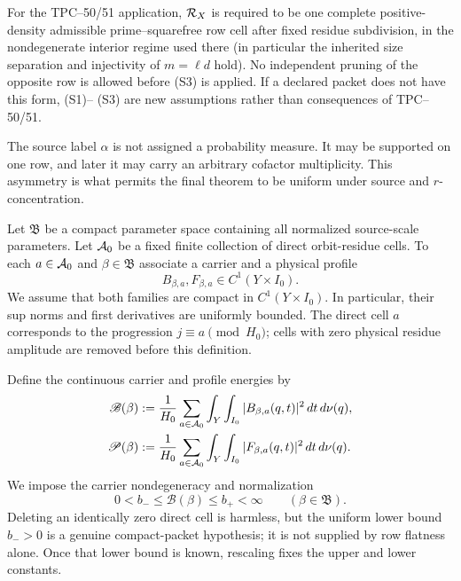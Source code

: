 For the TPC--50/51 application, \(\mathcal R_X\) is required to be one complete
positive-density admissible prime--squarefree row cell after fixed residue
subdivision, in the nondegenerate interior regime used there (in particular
the inherited size separation and injectivity of \(m=\ell d\) hold).  No
independent pruning of the opposite row is allowed before \textup{(S3)} is
applied.  If a declared packet does not have this form, \textup{(S1)}--
\textup{(S3)} are new assumptions rather than consequences of TPC--50/51.

The source label \(\alpha\) is not assigned a probability measure.  It may
be supported on one row, and later it may carry an arbitrary cofactor
multiplicity.  This asymmetry is what permits the final theorem to be
uniform under source and \(r\)-concentration.

Let \(\mathfrak B\) be a compact parameter space containing all normalized
source-scale parameters.  Let \(\mathcal A_0\) be a fixed finite collection of
direct orbit-residue cells.  To each \(a\in\mathcal A_0\) and
\(\beta\in\mathfrak B\) associate a carrier and a physical profile
\begin{equation}
 B_{\beta,a},F_{\beta,a}\in C^1(Y\times I_0).
 \label{eq:tpc52-carrier-profile-family}
\end{equation}
We assume that both families are compact in \(C^1(Y\times I_0)\).  In
particular, their sup norms and first derivatives are uniformly bounded.
The direct cell \(a\) corresponds to the progression
\(j\equiv a\pmod {H_0}\); cells with zero physical residue amplitude are
removed before this definition.

Define the continuous carrier and profile energies by
\begin{align}
 \mathscr B(\beta)
 &:=\frac1{H_0}\sum_{a\in\mathcal A_0}
   \int_Y\int_{I_0}|B_{\beta,a}(q,t)|^2\,dt\,d\nu(q),
 \label{eq:tpc52-continuous-carrier}\\
 \mathscr P(\beta)
 &:=\frac1{H_0}\sum_{a\in\mathcal A_0}
   \int_Y\int_{I_0}|F_{\beta,a}(q,t)|^2\,dt\,d\nu(q).
 \label{eq:tpc52-continuous-profile}
\end{align}
We impose the carrier nondegeneracy and normalization
\begin{equation}
 0<b_-\le \mathscr B(\beta)\le b_+<\infty
 \qquad(\beta\in\mathfrak B).
 \label{eq:tpc52-carrier-normalization}
\end{equation}
Deleting an identically zero direct cell is harmless, but the uniform lower
bound \(b_->0\) is a genuine compact-packet hypothesis; it is not supplied
by row flatness alone.  Once that lower bound is known, rescaling fixes the
upper and lower constants.

